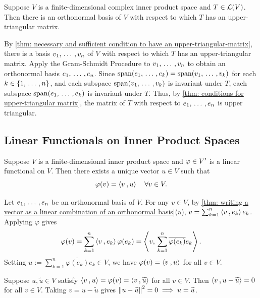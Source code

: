 \begin{thm}
  \label{thm: schur's theorem}
  Suppose $V$ is a finite-dimensional complex inner product space and $T \in \mathcal{L}(V)$. Then there is an orthonormal basis of $V$ with respect to which $T$ has an upper-triangular matrix.
\end{thm}
\begin{prf}
  By \ref{thm: necessary and sufficient condition to have an upper-triangular-matrix}, there is a basis $v_1, {\, \ldots \,\,}, v_n$ of $V$ with respect to which $T$ has an upper-triangular matrix.
  Apply the Gram-Schmidt Procedure to $v_1, {\, \ldots \,\,}, v_n$ to obtain an orthonormal basis $e_1, {\, \ldots \,\,}, e_n$.
  Since $\operatorname{span} (e_1, {\, \ldots \,\,}, e_k) = \operatorname{span} (v_1, {\, \ldots \,\,}, v_k)$ for each $k \in \{1, {\, \ldots \,\,}, n\}$, and each subspace $\operatorname{span} (v_1, {\, \ldots \,\,}, v_k)$ is invariant under $T$, each subspace $\operatorname{span} (e_1, {\, \ldots \,\,}, e_k)$ is invariant under $T$.
  Thus, by \ref{thm: conditions for upper-triangular matrix}, the matrix of $T$ with respect to $e_1, {\, \ldots \,\,}, e_n$ is upper triangular.
\end{prf}

\subsection{Linear Functionals on Inner Product Spaces}

\begin{thm}
  \label{thm: riesz representation theorem}
  Suppose $V$ is a finite-dimensional inner product space and $\varphi \in \displaystyle V'$ is a linear functional on $V$. Then there exists a unique vector $u \in V$ such that
  \begin{equation}
    \varphi(v) = \ip{v}{u} \quad \forall v \in V.
  \end{equation}
\end{thm}
\begin{prf}
   Let $e_1, {\, \ldots \,\,}, e_n$ be an orthonormal basis of $V$.
  For any $v \in V$, by \ref{thm: writing a vector as a linear combination of an orthonormal basis}(a), $v = \sum_{k=1}^n \ip{v}{e_k} e_k$.
  Applying $\varphi$ gives
  \begin{equation}
    \varphi(v) = \sum_{k=1}^n \ip{v}{e_k} \varphi(e_k) = \left\langle v, \, \sum_{k=1}^n \overline{\varphi(e_k)} e_k \right\rangle.
  \end{equation}
  Setting $u := \sum_{k=1}^n \overline{\varphi(e_k)} e_k \in V$, we have $\varphi(v) = \ip{v}{u}$ for all $v \in V$.

   Suppose $u, \widetilde{u} \in V$ satisfy $\ip{v}{u} = \varphi(v) = \ip{v}{\widetilde{u}}$ for all $v \in V$.
  Then $\ip{v}{u - \widetilde{u}} = 0$ for all $v \in V$. Taking $v = u - \widetilde{u}$ gives $\left \lVert u - \widetilde{u} \right \rVert^2 = 0 \implies u = \widetilde{u}$.
\end{prf}

